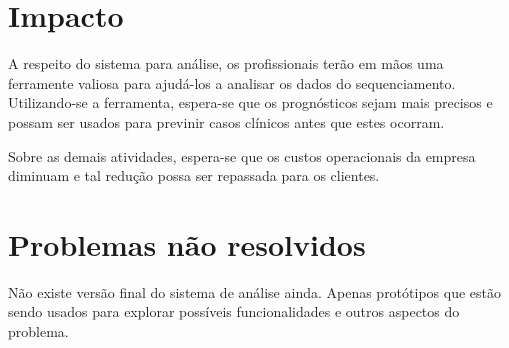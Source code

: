 %

\section{Impacto}

A respeito do sistema para análise, os profissionais terão em mãos uma ferramente valiosa para ajudá-los a analisar os dados
do sequenciamento. Utilizando-se a ferramenta, espera-se que os prognósticos sejam mais precisos e possam ser usados para
previnir casos clínicos antes que estes ocorram.

Sobre as demais atividades, espera-se que os custos operacionais da empresa diminuam e tal redução possa ser repassada para os clientes.





\section{Problemas não resolvidos}

Não existe versão final do sistema de análise ainda. Apenas protótipos que estão sendo usados para explorar possíveis funcionalidades e outros aspectos do problema.
